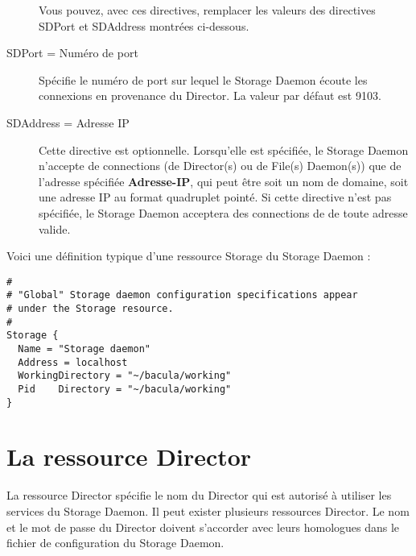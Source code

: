 \begin{description}
Vous pouvez, avec ces directives, remplacer les valeurs des directives  SDPort et 
SDAddress montr\'ees ci-dessous.

\item [SDPort = \lt{}Num\'ero de port\gt{}]
   Sp\'ecifie le num\'ero de port sur lequel le Storage Daemon \'ecoute les connexions 
   en provenance du Director. La valeur par d\'efaut est 9103.
   
\item [SDAddress = \lt{}Adresse IP\gt{}]
    Cette directive est optionnelle. Lorsqu'elle est sp\'ecifi\'ee, le Storage Daemon n'accepte
    de connections (de Director(s) ou de File(s) Daemon(s)) que de l'adresse sp\'ecifi\'ee 
    {\bf Adresse-IP}, qui peut \^etre
    soit un nom de domaine, soit une adresse IP au format quadruplet point\'e.
    Si cette directive n'est pas sp\'ecifi\'ee, le Storage Daemon acceptera des connections de 
    de toute adresse valide. 

\end{description}

Voici une d\'efinition typique d'une ressource Storage du Storage Daemon :


\footnotesize
\begin{verbatim}
#
# "Global" Storage daemon configuration specifications appear
# under the Storage resource.
#
Storage {
  Name = "Storage daemon"
  Address = localhost
  WorkingDirectory = "~/bacula/working"
  Pid    Directory = "~/bacula/working"
}
\end{verbatim}
\normalsize

\section{La ressource Director}
\label{DirectorResource1}

La ressource Director sp\'ecifie le nom du Director qui est autoris\'e 
\`a utiliser les services du Storage Daemon. Il peut exister plusieurs 
ressources Director. Le nom et le mot de passe du Director doivent 
s'accorder avec leurs homologues dans le fichier de configuration 
du Storage Daemon.

